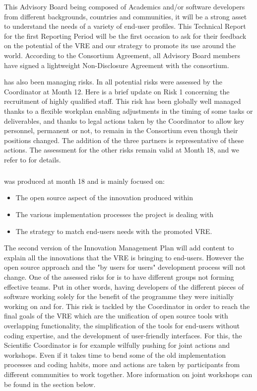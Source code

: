 This Advisory Board being composed of Academics and/or software
developers from different backgrounds, countries and communities, it
will be a strong asset to understand the needs of a variety of
end-user profiles. This Technical Report for the first Reporting
Period will be the first occasion to ask for their feedback on the
potential of the VRE and our strategy to promote its use around the
world. According to the Consortium Agreement, all Advisory Board
members have signed a lightweight Non-Disclosure Agreement with the
consortium.

 has also been managing risks. In 
all potential risks were assessed by the Coordinator at Month 12. Here
is a brief update on Risk 1 concerning the recruitment of highly
qualified staff. This risk has been globally well managed thanks to a
flexible workplan enabling adjustments in the timing of some tasks or
deliverables, and thanks to legal actions taken by the Coordinator to
allow key personnel, permanent or not, to remain in the Consortium
even though their positions changed. The addition of the three
partners is representative of these actions. The assessment for the
other risks remain valid at Month 18, and we refer to
 for details.

\subparagraph{}

 was produced at month 18 and is mainly focused on:

\begin{itemize}
\item{The open source aspect of the innovation produced within \ODK}
\item{The various implementation processes the project is dealing with}
\item{The strategy to match end-users needs with the promoted VRE}.
\end{itemize}

  The second version of the Innovation Management Plan will add content to explain all the
  innovations that the VRE is bringing to end-users. However the open source approach and
  the "by users for users" development process will not change.  One
  of the assessed risks for \ODK is to have different groups not forming effective teams. Put
  in other words, having developers of the different pieces of software working solely for
  the benefit of the programme they were initially working on and for. This risk is
  tackled by the Coordinator in order to reach the final goals of the VRE which are the
  unification of open source tools with overlapping functionality, the simplification of
  the tools for end-users without coding expertise, and the development of user-friendly
  interfaces. For this, the Scientific Coordinator is for example wilfully pushing
  for joint actions and
  workshops. Even if it takes time to bend some of the old implementation processes and coding habits,
  more and actions are taken by \ODK participants from different communities to work
  together. More information on joint workshops can be found in the section below.


